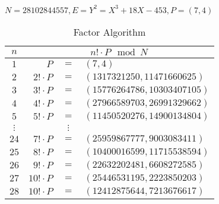 \documentclass[12pt]{article}
\begin{document}
\subproblem $N=28102844557,E=Y^2=X^3+18X-453,P=(7,4)$

\solution
\begin{table}[!ht]
    \centering
    \begin{tabular}{|c|rcl|}
        \hline
        $n$      & \multicolumn{3}{c|}{$n!\cdot P\mod{N}$}                                          \\ \hline
        $1$      & $P$                                     & $=$      & $(7,4)$                     \\ \hline
        $2$      & $2!\cdot P$                             & $=$      & $(1317321250,11471660625)$  \\ \hline
        $3$      & $3!\cdot P$                             & $=$      & $(15776264786,10303407105)$ \\ \hline
        $4$      & $4!\cdot P$                             & $=$      & $(27966589703,26991329662)$ \\ \hline
        $5$      & $5!\cdot P$                             & $=$      & $(11450520276,14900134804)$ \\ \hline
        $\vdots$ &                                         & $\vdots$ &                             \\ \hline
        $24$     & $7!\cdot P$                             & $=$      & $(25959867777,9003083411)$  \\ \hline
        $25$     & $8!\cdot P$                             & $=$      & $(10400016599,11715538594)$ \\ \hline
        $26$     & $9!\cdot P$                             & $=$      & $(22632202481,6608272585)$  \\ \hline
        $27$     & $10!\cdot P$                            & $=$      & $(25446531195,2223850203)$  \\ \hline
        $28$     & $10!\cdot P$                            & $=$      & $(12412875644,7213676617)$  \\ \hline
    \end{tabular}
    \caption{Factor Algorithm}
\end{table}
\end{document}
